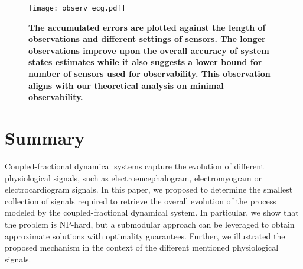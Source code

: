  \begin{figure}[htb]
\centering
\texttt{[image: observ\_ecg.pdf]}
\caption{\textbf{The accumulated errors are plotted against the length of observations and different settings of sensors. The longer observations improve upon the overall accuracy of system states estimates while it also suggests a lower bound for number of sensors used for observability. This observation aligns with our theoretical analysis on minimal observability. }}\label{fig:observ_ecg}
\vskip -4mm
\end{figure} 
\section{Summary}


Coupled-fractional dynamical systems capture the evolution of different physiological signals, such as electroencephalogram, electromyogram or electrocardiogram signals. In this paper, we proposed to determine the smallest collection of signals required to retrieve the overall evolution of the process modeled by the coupled-fractional dynamical system. In particular, we show that the problem is NP-hard, but a submodular approach  can be leveraged to obtain approximate solutions with optimality guarantees. Further, we illustrated the proposed mechanism in the context of the different mentioned physiological signals.
